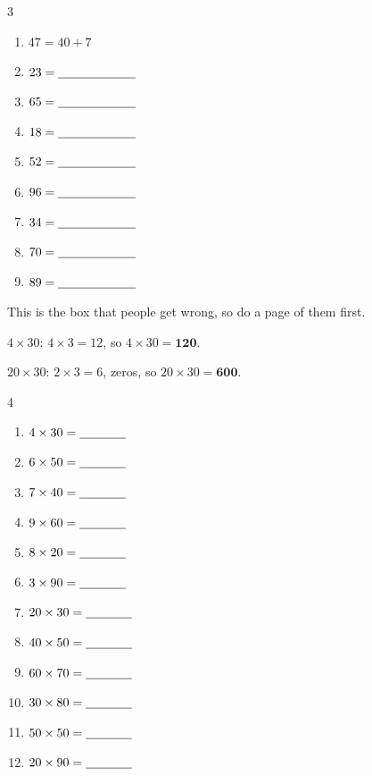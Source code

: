 \documentclass[12pt,a4paper]{article}
\begin{document}
\vspace{4pt}
\begin{multicols}{3}
\begin{enumerate}[label=(\alph*), itemsep=10pt]
  \item $47 = 40 + 7$
  \item $23 = \blank[2.2cm]$
  \item $65 = \blank[2.2cm]$
  \item $18 = \blank[2.2cm]$
  \item $52 = \blank[2.2cm]$
  \item $96 = \blank[2.2cm]$
  \item $34 = \blank[2.2cm]$
  \item $70 = \blank[2.2cm]$
  \item $89 = \blank[2.2cm]$
\end{enumerate}
\end{multicols}


\noindent This is the box that people get wrong, so do a page of them first.

\begin{remember}
  \hspace*{1.2em}$4 \times 30$: \; $4 \times 3 = 12$, \; so \; $4 \times 30 =
  \mathbf{120}$.

  \smallskip
  \hspace*{1.2em}$20 \times 30$: \; $2 \times 3 = 6$, \;  zeros, \; so \;
  $20 \times 30 = \mathbf{600}$.
\end{remember}

\vspace{2pt}
\begin{multicols}{4}
\begin{enumerate}[label=(\alph*), itemsep=10pt]
  \item $4 \times 30 = \blank[1.3cm]$
  \item $6 \times 50 = \blank[1.3cm]$
  \item $7 \times 40 = \blank[1.3cm]$
  \item $9 \times 60 = \blank[1.3cm]$
  \item $8 \times 20 = \blank[1.3cm]$
  \item $3 \times 90 = \blank[1.3cm]$
  \item $20 \times 30 = \blank[1.3cm]$
  \item $40 \times 50 = \blank[1.3cm]$
  \item $60 \times 70 = \blank[1.3cm]$
  \item $30 \times 80 = \blank[1.3cm]$
  \item $50 \times 50 = \blank[1.3cm]$
  \item $20 \times 90 = \blank[1.3cm]$
\end{enumerate}
\end{multicols}
\end{document}
